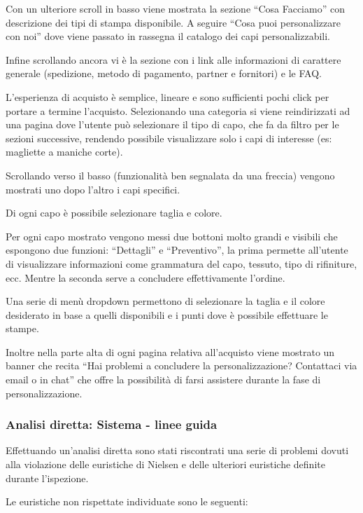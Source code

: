 \documentclass[12pt,italian,]{report}
\begin{document}
Con un ulteriore scroll in basso viene mostrata la sezione ``Cosa
Facciamo'' con descrizione dei tipi di stampa disponibile. A seguire
``Cosa puoi personalizzare con noi'' dove viene passato in rassegna il
catalogo dei capi personalizzabili.

Infine scrollando ancora vi è la sezione con i link alle informazioni di
carattere generale (spedizione, metodo di pagamento, partner e
fornitori) e le FAQ.

L'esperienza di acquisto è semplice, lineare e sono sufficienti pochi
click per portare a termine l'acquisto. Selezionando una categoria si
viene reindirizzati ad una pagina dove l'utente può selezionare il tipo
di capo, che fa da filtro per le sezioni successive, rendendo possibile
visualizzare solo i capi di interesse (es: magliette a maniche corte).

Scrollando verso il basso (funzionalità ben segnalata da una freccia)
vengono mostrati uno dopo l'altro i capi specifici.

Di ogni capo è possibile selezionare taglia e colore.

Per ogni capo mostrato vengono messi due bottoni molto grandi e visibili
che espongono due funzioni: ``Dettagli'' e ``Preventivo'', la prima
permette all'utente di visualizzare informazioni come grammatura del
capo, tessuto, tipo di rifiniture, ecc. Mentre la seconda serve a
concludere effettivamente l'ordine.

Una serie di menù dropdown permettono di selezionare la taglia e il
colore desiderato in base a quelli disponibili e i punti dove è
possibile effettuare le stampe.

Inoltre nella parte alta di ogni pagina relativa all'acquisto viene
mostrato un banner che recita ``Hai problemi a concludere la
personalizzazione? Contattaci via email o in chat'' che offre la
possibilità di farsi assistere durante la fase di personalizzazione.

\hypertarget{analisi-diretta-sistema---linee-guida-1}{%
\subsubsection{Analisi diretta: Sistema - linee
guida}\label{analisi-diretta-sistema---linee-guida-1}}

Effettuando un'analisi diretta sono stati riscontrati una serie di
problemi dovuti alla violazione delle euristiche di Nielsen e delle
ulteriori euristiche definite durante l'ispezione.

Le euristiche non rispettate individuate sono le seguenti:
\end{document}
